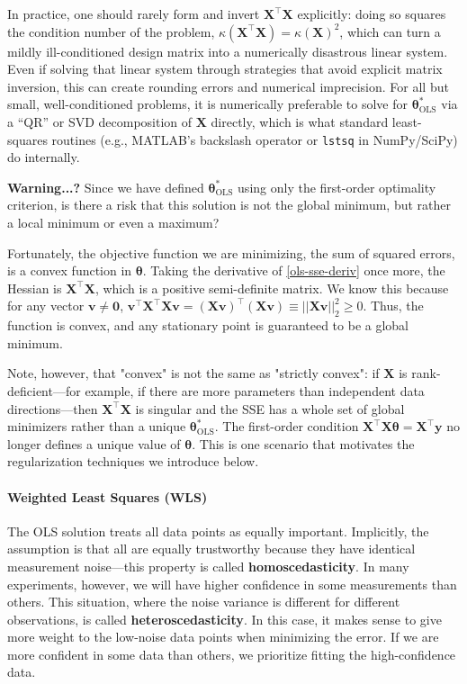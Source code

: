 In practice, one should rarely form and invert $\mathbf{X}^\top\mathbf{X}$ explicitly: doing so squares the condition number of the problem, $\kappa(\mathbf{X}^\top\mathbf{X}) = \kappa(\mathbf{X})^2$, which can turn a mildly ill-conditioned design matrix into a numerically disastrous linear system. Even if solving that linear system through strategies that avoid explicit matrix inversion, this can create rounding errors and numerical imprecision. For all but small, well-conditioned problems, it is numerically preferable to solve for $\boldsymbol{\theta}^*_\text{OLS}$ via a ``QR'' or SVD decomposition of $\mathbf{X}$ directly, which is what standard least-squares routines (e.g., MATLAB's backslash operator or \texttt{lstsq} in NumPy/SciPy) do internally.

\begin{warningBox}
    \textbf{Warning...?}
    Since we have defined $\boldsymbol{\theta}^*_\text{OLS}$ using only the first-order optimality criterion, is there a risk that this solution is not the global minimum, but rather a local minimum or even a maximum? 
    
    Fortunately, the objective function we are minimizing, the sum of squared errors, is a convex function in $\boldsymbol{\theta}$. Taking the derivative of \autoref{ols-sse-deriv} once more, the Hessian is $\mathbf{X}^\top \mathbf{X}$, which is a positive semi-definite matrix. We know this because for any vector $\mathbf{v} \neq \mathbf{0}$, $\mathbf{v}^\top \mathbf{X}^\top \mathbf{X} \mathbf{v} = (\mathbf{X} \mathbf{v})^\top (\mathbf{X} \mathbf{v}) \equiv || \mathbf{Xv} ||_2^2 \ge 0$. Thus, the function is convex, and any stationary point is guaranteed to be a global minimum.

Note, however, that "convex" is not the same as "strictly convex": if $\mathbf{X}$ is rank-deficient---for example, if there are more parameters than independent data directions---then $\mathbf{X}^\top\mathbf{X}$ is singular and the SSE has a whole set of global minimizers rather than a unique $\boldsymbol{\theta}^*_\text{OLS}$. The first-order condition $\mathbf{X}^\top\mathbf{X}\boldsymbol{\theta} = \mathbf{X}^\top\mathbf{y}$ no longer defines a unique value of $\boldsymbol{\theta}$. This is one scenario that motivates the regularization techniques we introduce below.
\end{warningBox}

\paragraph*{Weighted Least Squares (WLS)}
The OLS solution treats all data points as equally important. Implicitly, the assumption is that all are equally trustworthy because they have identical measurement noise---this property is called \textbf{homoscedasticity}. In many experiments, however, we will have higher confidence in some measurements than others. This situation, where the noise variance is different for different observations, is called \textbf{heteroscedasticity}. In this case, it makes sense to give more weight to the low-noise data points when minimizing the error. If we are more confident in some data than others, we prioritize fitting the high-confidence data. 

